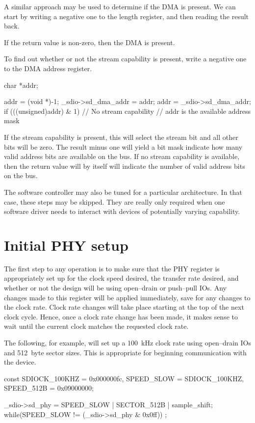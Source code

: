 \documentclass{gqtekspec}
\begin{document}
A similar approach may be used to determine if the DMA is present.  We can
start by writing a negative one to the length register, and then reading
the result back.
\begin{zCpp}
	unsigned	ln;
	char		*addr;

	_sdio->sd_dma_length = -1;
	ln = _sdio->sd_dma_length;
	if (ln != 0) { // DMA is present
\end{zCpp}
If the return value is non-zero, then the DMA is present.

To find out whether or not the stream capability is present, write a negative
one to the DMA address register.
\begin{zCpp}
	char		*addr;

	addr = (void *)-1;
	_sdio->sd_dma_addr = addr;
	addr = _sdio->sd_dma_addr;
	if (((unsigned)addr) & 1) {
		// No stream capability
		// addr is the available address mask
	}
\end{zCpp}
If the stream capability is present, this will select the stream bit
and all other bits will be zero.  The result minus one will yield a bit
mask indicate how many valid address bits are available on the bus.  If
no stream capability is available, then the return value will by itself
will indicate the number of valid address bits on the bus.

The software controller may also be tuned for a particular architecture.
In that case, these steps may be skipped.  They are really only required
when one software driver needs to interact with devices of potentially
varying capability.
\section{Initial PHY setup}
The first step to any operation is to make sure that the PHY register
is appropriately set up for the clock speed desired, the transfer rate
desired, and whether or not the design will be using open--drain or push--pull
IOs.  Any changes made to this register will be applied immediately, save
for any changes to the clock rate.  Clock rate changes will take place starting
at the top of the next clock cycle.  Hence, once a clock rate change has been
made, it makes sense to wait until the current clock matches the requested
clock rate.

The following, for example, will set up a 100~kHz clock rate using open--drain
IOs and 512~byte sector sizes.  This is appropriate for beginning communication
with the device.

\begin{zCpp}
	const	SDIOCK_100KHZ = 0x000000fc,
		SPEED_SLOW    = SDIOCK_100KHZ,
		SPEED_512B    = 0x09000000;

	_sdio->sd_phy = SPEED_SLOW | SECTOR_512B | sample_shift;
	while(SPEED_SLOW != (_sdio->sd_phy & 0x0ff))
		;
\end{zCpp}
\end{document}
